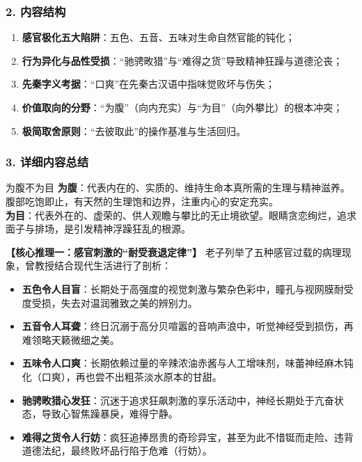 \subsubsection{2. 内容结构}
\begin{enumerate}
    \item \textbf{感官极化五大陷阱}：五色、五音、五味对生命自然官能的钝化；
    \item \textbf{行为异化与品性受损}：“驰骋畋猎”与“难得之货”导致精神狂躁与道德沦丧；
    \item \textbf{先秦字义考据}：“口爽”在先秦古汉语中指味觉败坏与伤失；
    \item \textbf{价值取向的分野}：“为腹”（向内充实）与“为目”（向外攀比）的根本冲突；
    \item \textbf{极简取舍原则}：“去彼取此”的操作基准与生活回归。
\end{enumerate}

\subsubsection{3. 详细内容总结}

\begin{ConceptBox}{为腹不为目}
\textbf{为腹}：代表内在的、实质的、维持生命本真所需的生理与精神滋养。腹部吃饱即止，有天然的生理饱和边界，注重内心的安定充实。\\
\textbf{为目}：代表外在的、虚荣的、供人观瞻与攀比的无止境欲望。眼睛贪恋绚烂，追求面子与排场，是引发精神浮躁狂乱的根源。
\end{ConceptBox}

\noindent\textbf{【核心推理一：感官刺激的“耐受衰退定律”】}
老子列举了五种感官过载的病理现象，曾教授结合现代生活进行了剖析：
\begin{itemize}
    \item \textbf{五色令人目盲}：长期处于高强度的视觉刺激与繁杂色彩中，瞳孔与视网膜耐受度受损，失去对温润雅致之美的辨别力。
    \item \textbf{五音令人耳聋}：终日沉溺于高分贝喧嚣的音响声浪中，听觉神经受到损伤，再难领略天籁微细之美。
    \item \textbf{五味令人口爽}：长期依赖过量的辛辣浓油赤酱与人工增味剂，味蕾神经麻木钝化（口爽），再也尝不出粗茶淡水原本的甘甜。
    \item \textbf{驰骋畋猎心发狂}：沉迷于追求狂飙刺激的享乐活动中，神经长期处于亢奋状态，导致心智焦躁暴戾，难得宁静。
    \item \textbf{难得之货令人行妨}：疯狂追捧昂贵的奇珍异宝，甚至为此不惜铤而走险、违背道德法纪，最终败坏品行陷于危难（行妨）。
\end{itemize}

